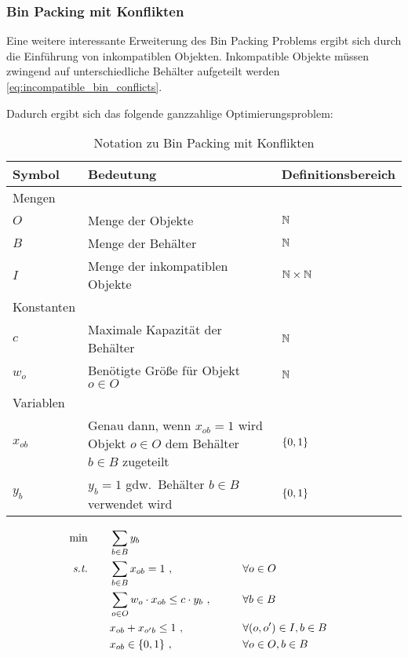 \subsubsection{Bin Packing mit Konflikten}\label{subsubsec:bin-packing-with-conflicts}

Eine weitere interessante Erweiterung des Bin Packing Problems ergibt sich durch die Einführung
von inkompatiblen Objekten.
Inkompatible Objekte müssen zwingend auf unterschiedliche Behälter aufgeteilt werden \eqref{eq:incompatible_bin_conflicts}.

Dadurch ergibt sich das folgende ganzzahlige Optimierungsproblem:
\begin{table}[H]
    \begin{tabularx}{\textwidth}{  l | X | l }
    Symbol & Bedeutung & Definitionsbereich \\\hline\hline
    Mengen & & \\\hline\hline
    $O$ & Menge der Objekte & $\mathbb{N}$\\\hline
    $B$ & Menge der Behälter & $\mathbb{N}$\\\hline
    $I$ & Menge der inkompatiblen Objekte & $\mathbb{N}\times\mathbb{N}$\\\hline\hline
    Konstanten &  &  \\\hline\hline
    $c$ & Maximale Kapazität der Behälter & $\mathbb{N}$\\\hline
    $w_o$ & Benötigte Größe für Objekt $o\in O$ & $\mathbb{N}$\\\hline\hline
    Variablen &  &  \\\hline\hline
    $x_{ob}$ & Genau dann, wenn $x_{ob}=1$ wird Objekt $o\in O$ dem Behälter $b\in B$ zugeteilt & $\{0,1\}$\\\hline
    $y_b$ & $y_b=1$ gdw.\ Behälter $b\in B$ verwendet wird & $\{0,1\}$\\\hline
    \end{tabularx}
    \caption{Notation zu Bin Packing mit Konflikten}\label{tab:notation_bin_packing_conflicts}
\end{table}

\begin{align}
    \min \qquad & \sum_{b\in B} y_b \label{eq:objective_bin_conflicts}\\
    \textit{s.t.} \qquad 
    & \sum_{b\in B} x_{ob} = 1~, \qquad &&\forall o\in O \label{eq:assignment_bin_conflicts} \\
    & \sum_{o\in O} w_{o} \cdot x_{ob} \leq c \cdot y_b~, \qquad &&\forall b\in B \label{eq:capacity_bin_conflicts} \\
    & x_{ob} + x_{o'b} \leq 1~, \qquad &&\forall (o,o')\in I, b\in B\label{eq:incompatible_bin_conflicts}\\
    & x_{ob} \in \{0,1\}~, \qquad &&\forall o\in O, b\in B
\end{align}
